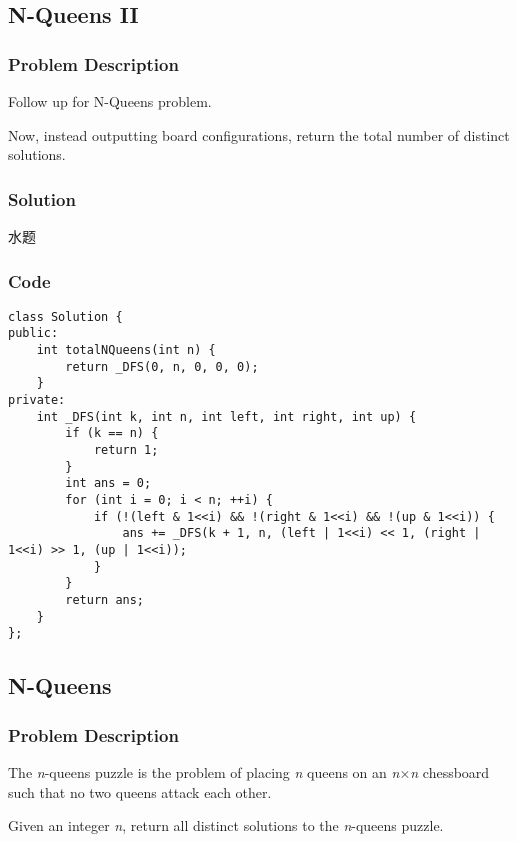 \documentclass[courier]{article}
\begin{document}
\begin{CJK*}{UTF8}{gkai}
\begin{lstlisting}
\end{lstlisting}


\subsection{ N-Queens II }

\subsubsection*{Problem Description}
Follow up for N-Queens problem.

Now, instead outputting board configurations, return the total number of distinct solutions.





\subsubsection*{Solution}
水题

\subsubsection*{Code}
\begin{lstlisting}
class Solution {
public:
    int totalNQueens(int n) {
        return _DFS(0, n, 0, 0, 0);
    }
private:
    int _DFS(int k, int n, int left, int right, int up) {
        if (k == n) {
            return 1;
        }
        int ans = 0;
        for (int i = 0; i < n; ++i) {
            if (!(left & 1<<i) && !(right & 1<<i) && !(up & 1<<i)) {
                ans += _DFS(k + 1, n, (left | 1<<i) << 1, (right | 1<<i) >> 1, (up | 1<<i));
            }
        }
        return ans;
    }
}; 
\end{lstlisting}


\subsection{ N-Queens }

\subsubsection*{Problem Description}
The \emph{n}-queens puzzle is the problem of placing \emph{n} queens on an \emph{n}×\emph{n} chessboard such that no two queens attack each other.



Given an integer \emph{n}, return all distinct solutions to the \emph{n}-queens puzzle.


\end{CJK*}
\end{document}
